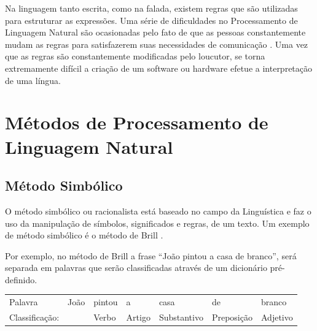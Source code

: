 Na linguagem tanto escrita, como na falada, existem regras que são utilizadas
para estruturar as expressões. Uma série de dificuldades no Processamento de
Linguagem Natural são ocasionadas pelo fato de que as pessoas constantemente
mudam as regras para satisfazerem suas necessidades de comunicação \cite{manningschutze1999}. Uma vez que as regras são
constantemente modificadas pelo loucutor, se torna extremamente difícil a criação de um software ou hardware efetue a interpretação de uma língua. 

% 
% 
% 

\section{Métodos de Processamento de Linguagem Natural}

\subsection{Método Simbólico} 
O método simbólico ou racionalista está
baseado no campo da Linguística e faz o uso da manipulação de símbolos,
significados e regras, de um texto. Um exemplo de método simbólico é o método de
Brill \cite{Brill:1992:SRP:974499.974526}.

Por exemplo, no método de Brill a frase ``João pintou a casa de branco'', será
separada em palavras que serão classificadas através de um dicionário pré-definido.

\begin{table}[htb]
\centering
\begin{tabular}{l|l|l|l|l|l|l}
Palavra         & João        & pintou & a      & casa        & de        
& branco
         \\
Classificação:   & 			   & Verbo  & Artigo & Substantivo & Preposição & Adjetivo
\end{tabular}
\label{my-label}
\end{table}

